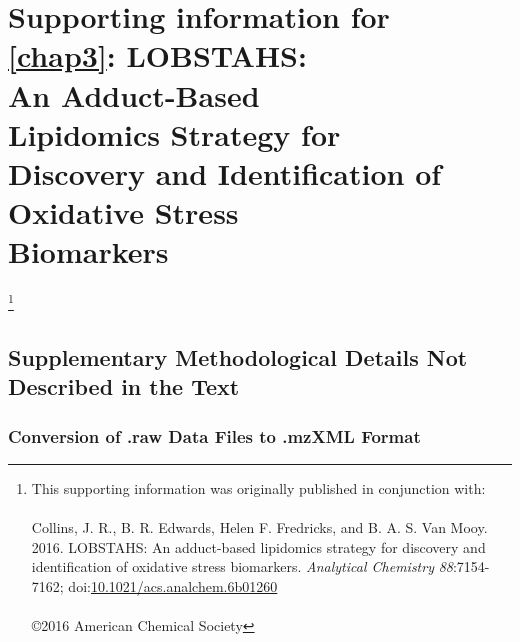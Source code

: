 
\begingroup%
\makeatletter%
\cleardoublepage%
\let\newpage\relax%
\let\clearpage\relax%
\vspace*{\fill}%
\vspace*{\dimexpr-50\p@-\baselineskip}%
\chapter[Supporting information for Chapter 3]{{\setlength{\huge} Supporting information for}\\ \autoref{chap3}: LOBSTAHS: \\An Adduct-Based\\Lipidomics Strategy for \\Discovery and Identification of Oxidative Stress \\Biomarkers}
\label{AppD}
\let\thefootnote\relax\footnote{{\setlength{\parindent}{0pt}This supporting information was originally published in conjunction with:\\\\Collins, J. R., B. R. Edwards, Helen F. Fredricks, and B. A. S. Van Mooy. 2016. LOBSTAHS: An adduct-based lipidomics strategy for discovery and identification of oxidative stress biomarkers. \emph{Analytical Chemistry} \emph{88}:7154-7162; doi:\href{http://dx.doi.org/10.1021/acs.analchem.6b01260}{10.1021/acs.analchem.6b01260}\\\\\copyright 2016 American Chemical Society}}
\vspace*{\fill}%
\endgroup%

\clearpage

\section{Supplementary Methodological Details Not Described in the Text}
\label{sec:Supplementary Methodological Details Not Described in the Text}

\subsection{Conversion of .raw Data Files to .mzXML Format}

